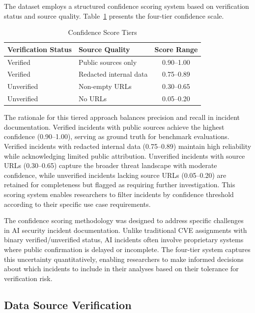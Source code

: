 \documentclass[10pt,conference]{IEEEtran}
\begin{document}
The dataset employs a structured confidence scoring system based on verification status and source quality. Table~\ref{tab:confidence} presents the four-tier confidence scale.

\begin{table}[htbp]
\caption{Confidence Score Tiers}
\label{tab:confidence}
\centering
\begin{tabular}{llc}
\toprule
\textbf{Verification Status} & \textbf{Source Quality} & \textbf{Score Range} \\
\midrule
Verified & Public sources only & 0.90--1.00 \\
Verified & Redacted internal data & 0.75--0.89 \\
Unverified & Non-empty URLs & 0.30--0.65 \\
Unverified & No URLs & 0.05--0.20 \\
\bottomrule
\end{tabular}
\end{table}

The rationale for this tiered approach balances precision and recall in incident documentation. Verified incidents with public sources achieve the highest confidence (0.90--1.00), serving as ground truth for benchmark evaluations. Verified incidents with redacted internal data (0.75--0.89) maintain high reliability while acknowledging limited public attribution. Unverified incidents with source URLs (0.30--0.65) capture the broader threat landscape with moderate confidence, while unverified incidents lacking source URLs (0.05--0.20) are retained for completeness but flagged as requiring further investigation. This scoring system enables researchers to filter incidents by confidence threshold according to their specific use case requirements.

The confidence scoring methodology was designed to address specific challenges in AI security incident documentation. Unlike traditional CVE assignments with binary verified/unverified status, AI incidents often involve proprietary systems where public confirmation is delayed or incomplete. The four-tier system captures this uncertainty quantitatively, enabling researchers to make informed decisions about which incidents to include in their analyses based on their tolerance for verification risk.

\subsection{Data Source Verification}
\end{document}
